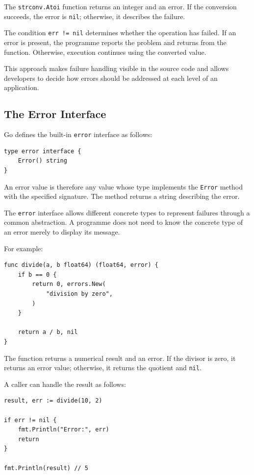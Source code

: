 The \texttt{strconv.Atoi} function returns an integer and an error. If the conversion succeeds, the error is \texttt{nil}; otherwise, it describes the failure.

The condition \texttt{err != nil} determines whether the operation has failed. If an error is present, the programme reports the problem and returns from the function. Otherwise, execution continues using the converted value.

This approach makes failure handling visible in the source code and allows developers to decide how errors should be addressed at each level of an application.

\subsection{The Error Interface}

Go defines the built-in \texttt{error} interface as follows:

\begin{lstlisting}
type error interface {
    Error() string
}
\end{lstlisting}

An error value is therefore any value whose type implements the \texttt{Error} method with the specified signature. The method returns a string describing the error.

The \texttt{error} interface allows different concrete types to represent failures through a common abstraction. A programme does not need to know the concrete type of an error merely to display its message.

For example:

\begin{lstlisting}
func divide(a, b float64) (float64, error) {
    if b == 0 {
        return 0, errors.New(
            "division by zero",
        )
    }

    return a / b, nil
}
\end{lstlisting}

The function returns a numerical result and an error. If the divisor is zero, it returns an error value; otherwise, it returns the quotient and \texttt{nil}.

A caller can handle the result as follows:

\begin{lstlisting}
result, err := divide(10, 2)

if err != nil {
    fmt.Println("Error:", err)
    return
}

fmt.Println(result) // 5
\end{lstlisting}

